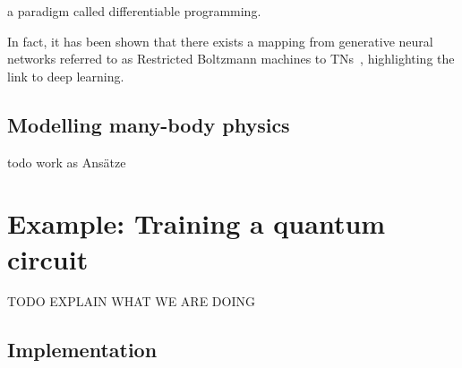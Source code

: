 a paradigm called differentiable programming.



In fact, it has been shown that there exists a mapping from generative neural networks referred to as Restricted Boltzmann machines to TNs~\cite{PhysRevB.97.085104}, highlighting the link to deep learning.


\subsection{Modelling many-body physics}

todo work as Ansätze









\section{Example: Training a quantum circuit}

TODO EXPLAIN WHAT WE ARE DOING

\subsection{Implementation}

